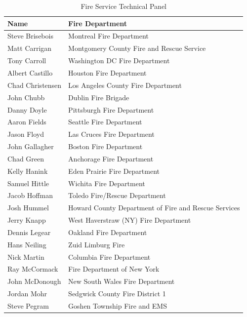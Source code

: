 \documentclass{article}
\begin{document}
\begin{center}
\begin{adjustwidth}{-0.25in}{-0.25in}
\begin{table}[H]
	\centering
	\caption*{Fire Service Technical Panel}
	\begin{tabular}{ll}
		\toprule[1.5pt]
		Name & Fire Department \\ 
		\midrule
		Steve Brisebois  & Montreal Fire Department \\ 
		Matt Carrigan    & Montgomery County Fire and Rescue Service \\ 
		Tony Carroll     & Washington DC Fire Department \\ 
		Albert Castillo  & Houston Fire Department \\ 
		Chad Christensen & Los Angeles County Fire Department \\ 
		John Chubb       & Dublin Fire Brigade \\ 		 		  
		Danny Doyle      & Pittsburgh Fire Department \\ 
		Aaron Fields     & Seattle Fire Department \\ 
		Jason Floyd      & Las Cruces Fire Department \\ 
		John Gallagher   & Boston Fire Department \\ 
		Chad Green       & Anchorage Fire Department \\ 
		Kelly Hanink     & Eden Prairie Fire Department \\ 
		Samuel Hittle    & Wichita Fire Department \\ 
		Jacob Hoffman    & Toledo Fire/Rescue Department \\ 
		Josh Hummel      & Howard County Department of Fire and Rescue Services \\ 
		Jerry Knapp      & West Haverstraw (NY) Fire Department \\ 
		Dennis Legear    & Oakland Fire Department \\ 
		Hans Neiling     & Zuid Limburg Fire \\ 
		Nick Martin      & Columbia Fire Department \\ 
		Ray McCormack    & Fire Department of New York \\ 
		John McDonough   & New South Wales Fire Department \\ 
		Jordan Mohr      & Sedgwick County Fire District 1 \\ 
		Steve Pegram     & Goshen Township Fire and EMS \\ 
		\bottomrule[1.25pt]
	\end{tabular}
\end{table}

\end{adjustwidth}
\end{center}
\end{document}
